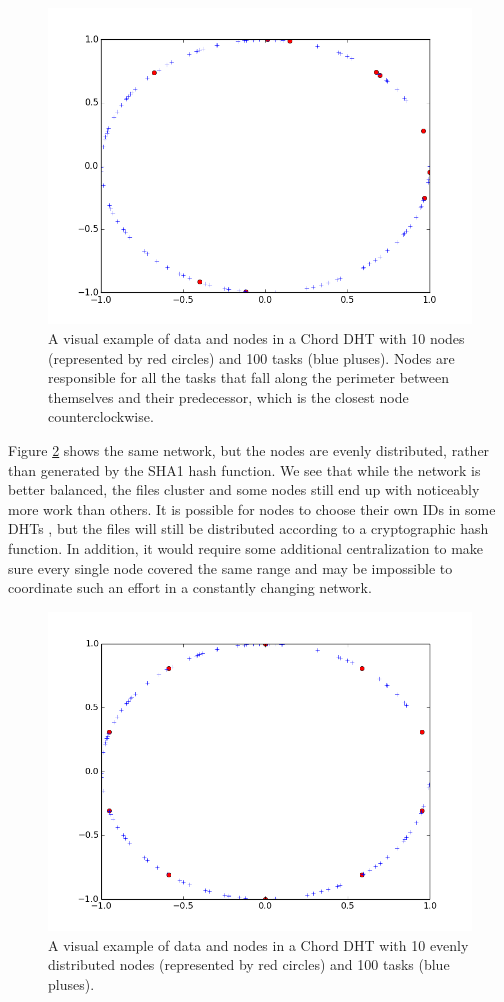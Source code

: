 \documentclass[11pt,letterpaper]{article}
\begin{document}
\begin{figure}
	\centering
	\includegraphics[width=0.7\linewidth]{figs/exampleChordDistribution}
	\caption[Distribution of Nodes and Tasks in a Chord DHT]{A visual example of data and nodes in a Chord DHT with 10 nodes (represented by red circles) and 100 tasks (blue pluses). Nodes are responsible for all the tasks that fall along the perimeter between themselves and their predecessor, which is the closest node counterclockwise.}
	\label{fig:exampleChordDistribution}
\end{figure}

Figure \ref{fig:exampleChordEvenDistribution} shows the same network, but the nodes are evenly distributed, rather than generated by the SHA1 hash function.
We see that while the network is better balanced, the files cluster and some nodes still end up with noticeably more work than others.
It is possible for nodes to choose their own IDs in some DHTs \cite{mainline}, but the files will still be distributed according to a cryptographic hash function.
In addition, it would require some additional centralization to make sure every single node covered the same range and may be impossible to coordinate such an effort in a constantly changing network.



\begin{figure}
	\centering
	\includegraphics[width=0.7\linewidth]{figs/exampleChordEvenDistribution}
	\caption[Distribution of Tasks in a Chord DHT  with Evenly Distributed Nodes]{A visual example of data and nodes in a Chord DHT with 10 evenly distributed nodes (represented by red circles) and 100 tasks (blue pluses).}
	\label{fig:exampleChordEvenDistribution}
\end{figure}
\end{document}
